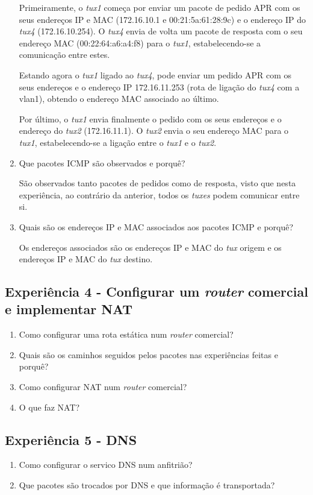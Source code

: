 \documentclass{article}
\begin{document}
\begin{enumerate}
Primeiramente, o \textit{tux1} começa por enviar um pacote de pedido APR com os seus endereços IP e MAC (172.16.10.1 e 00:21:5a:61:28:9c) e o endereço IP do \textit{tux4} (172.16.10.254). O \textit{tux4} envia de volta um pacote de resposta com o seu endereço MAC (00:22:64:a6:a4:f8) para o \textit{tux1}, estabelecendo-se a comunicação entre estes.

Estando agora o \textit{tux1} ligado ao \textit{tux4}, pode enviar um pedido APR com os seus endereços e o endereço IP  172.16.11.253 (rota de ligação do \textit{tux4} com a vlan1), obtendo o endereço MAC associado ao último.

Por último, o \textit{tux1} envia finalmente o pedido com os seus endereços e o endereço do \textit{tux2} (172.16.11.1). O \textit{tux2} envia o seu endereço MAC para o \textit{tux1}, estabelecendo-se a ligação entre o \textit{tux1} e o \textit{tux2}.


\item Que pacotes ICMP são observados e porquê?

São observados tanto pacotes de pedidos como de resposta, visto que nesta experiência, ao contrário da anterior, todos os \textit{tuxes} podem comunicar entre si.

\item Quais são os endereços IP e MAC associados aos pacotes ICMP e porquê?

Os endereços associados são os endereços IP e MAC do \textit{tux} origem e os endereços IP e MAC do \textit{tux} destino.
\end{enumerate}
\subsection{Experiência 4 - Configurar um \textit{router} comercial e implementar NAT}
\begin{enumerate}
\item Como configurar uma rota estática num \textit{router} comercial?

\item Quais são os caminhos seguidos pelos pacotes nas experiências feitas e porquê?

\item Como configurar NAT num \textit{router} comercial?

\item O que faz NAT?
\end{enumerate}
\subsection{Experiência 5 - DNS}
\begin{enumerate}
\item Como configurar o servico DNS num anfitrião?

\item Que pacotes são trocados por DNS e que informação é transportada?
\end{enumerate}
\end{document}
